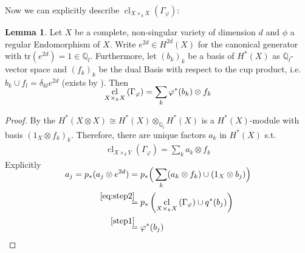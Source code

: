 \documentclass[english]{scrartcl}
\theoremstyle{definition}
\newtheorem{Lem}[Def]{Lemma}
\theoremstyle{remark}
\newcommand*{\Z}{\mathds{Z}}
\newcommand*{\Q}{\mathds{Q}}
\newcommand*{\Zl}{\Z_l} %
\newcommand*{\Ql}{\Q_l} %
\newcommand*{\idest}{i.e.\ }
\newcommand*{\Tr}{\text{tr}} %
\newcommand*{\tr}[1]{\Tr\left(#1\right)} %
\newcommand*{\Graph}[1]{{\Gamma_{#1}}} %
\DeclareMathOperator{\CL}{cl} %
\newcommand*{\cl}[2]{{\CL_{#1}\left(#2\right)}} %
\newcommand*{\one}[1]{{1_{#1}}}%
\let\altphi\phi
\renewcommand*{\phi}{\varphi}
\begin{document}
    Now we can explicitly describe
    $\cl{X\times_k X}{\Graph{\phi}}$:
    \begin{Lem}\label{clofgraph}
      Let $X$ be a complete, non-singular variety of dimension $d$
      and $\altphi$ a regular Endomorphism of $X$.
      Write $e^{2d}\in H^{2d}(X)$ for the canonical generator
      with $\tr{e^{2d}}=1\in\Ql$.
      Furthermore, let $(b_k)_k$ be a basis of $H^*(X)$ as
      $\Ql$-vector space and $(f_k)_k$ be the dual Basis with respect
      to the cup product, \idest $b_k\cup f_l=\delta_{kl}e^{2d}$
      (exists by ).
      Then
      \begin{gather*}
        \SwapAboveDisplaySkip
        \cl{X\times_k X}{\Graph{\phi}} =
        \sum_{k} \phi^*(b_k)\otimes  f_k
      \end{gather*}
      \begin{proof}
        By the  %
        $H^*(X\otimes X) \cong H^*(X)\otimes_{\Ql}H^*(X)$ is a
        $H^*(X)$-module with basis
        $(\one{X}\otimes f_k)_{k}$.
        Therefore, there are unique factors $a_{k}$ in $H^*(X)$ s.t.
        \begin{gather}
          \label{eq:step2}
          \cl{X\times_k Y}{\Graph{\phi}} =
          \sum_{k} a_k\otimes f_k
        \end{gather}
        Explicitly
        \begin{align*}
          \SwapAboveDisplaySkip
          a_j
          = p_*(a_j\otimes e^{2d})
          &= p_*\Big(
            \sum_k(a_k\otimes f_k)\cup (\one{X}\otimes b_j)
            \Big)\\
          &\overset{\mathllap{\eqref{eq:step2}}}= p_*\left(
            \cl{X\times_k X}{\Graph{\phi}} \cup q^*(b_j)
            \right)\\
          &\overset{\mathllap{\ref{step1}}}= \phi^*(b_j) 
        \end{align*}
      \end{proof}
    \end{Lem}
\end{document}
